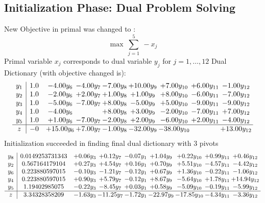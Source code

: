 \documentclass[8pt]{article}
\begin{document}
\subsection{Initialization Phase: Dual Problem Solving}
New Objective in primal was changed to : \[ \max\ \sum_{j=1}^{5}\ - x_j \] 
Primal variable $x_j$ corresponds to dual variable $y_j$ for $j = 1,\ldots,12$
Dual Dictionary (with objective changed is): 
\[\begin{array}{c| c c@{\hskip 2pt} c@{\hskip 2pt} c@{\hskip 2pt} c@{\hskip 2pt} c@{\hskip 2pt} c@{\hskip 2pt} c@{\hskip 2pt} }
 y_{1}   &  1.0 & -4.00 y_{6} & -4.00 y_{7} & -7.00 y_{8} & + 10.00 y_{9} & +  7.00 y_{10} & +  6.00 y_{11} & -1.00 y_{12}\\
 y_{2}   &  1.0 & -2.00 y_{6} & +  2.00 y_{7} & +  1.00 y_{8} & +  1.00 y_{9} & +  8.00 y_{10} & -6.00 y_{11} & -7.00 y_{12}\\
 y_{3}   &  1.0 & -5.00 y_{6} & -7.00 y_{7} & +  8.00 y_{8} & -5.00 y_{9} & +  5.00 y_{10} & -9.00 y_{11} & -9.00 y_{12}\\
 y_{4}   &  1.0 & -4.00 y_{6} &   & +  8.00 y_{8} & +  3.00 y_{9} & -2.00 y_{10} & -7.00 y_{11} & +  7.00 y_{12}\\
 y_{5}   &  1.0 & +  1.00 y_{6} & -7.00 y_{7} & -2.00 y_{8} & +  2.00 y_{9} & -6.00 y_{10} & +  2.00 y_{11} & -4.00 y_{12}\\
\hline
z    &  -0 & + 15.00 y_{6} & +  7.00 y_{7} & -1.00 y_{8} & -32.00 y_{9} & -38.00 y_{10} &   & + 13.00 y_{12}\\
\end{array}\]
Initialization succeeded in finding final dual dictionary with 3 pivots
\[\begin{array}{c| c c@{\hskip 2pt} c@{\hskip 2pt} c@{\hskip 2pt} c@{\hskip 2pt} c@{\hskip 2pt} c@{\hskip 2pt} c@{\hskip 2pt} }
 y_{8}   &  0.0149253731343 & +  0.06 y_{3} & +  0.12 y_{7} & -0.07 y_{1} & +  1.04 y_{9} & +  0.22 y_{10} & +  0.99 y_{11} & +  0.46 y_{12}\\
 y_{2}   &  0.567164179104 & +  0.27 y_{3} & +  4.54 y_{7} & +  0.16 y_{1} & +  0.70 y_{9} & +  5.51 y_{10} & -4.57 y_{11} & -4.42 y_{12}\\
 y_{6}   &  0.223880597015 & -0.10 y_{3} & -1.21 y_{7} & -0.12 y_{1} & +  0.67 y_{9} & +  1.36 y_{10} & -0.22 y_{11} & -1.06 y_{12}\\
 y_{4}   &  0.223880597015 & +  0.90 y_{3} & +  5.79 y_{7} & -0.12 y_{1} & +  8.67 y_{9} & -5.64 y_{10} & +  1.78 y_{11} & + 14.94 y_{12}\\
 y_{5}   &  1.19402985075 & -0.22 y_{3} & -8.45 y_{7} & +  0.03 y_{1} & +  0.58 y_{9} & -5.09 y_{10} & -0.19 y_{11} & -5.99 y_{12}\\
\hline
z    &  3.34328358209 & -1.63 y_{3} & -11.25 y_{7} & -1.72 y_{1} & -22.97 y_{9} & -17.85 y_{10} & -4.34 y_{11} & -3.36 y_{12}\\
\end{array}\]
\end{document}

